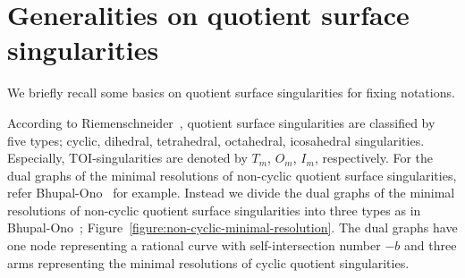 \documentclass[reqno, twoside, a4paper]{amsart}
\theoremstyle{definition}
\numberwithin{equation}{section}
\begin{document}
\section{Generalities on quotient surface singularities}
\label{section:generalities}

We briefly recall some basics on quotient surface singularities for fixing notations.

According to Riemenschneider~\cite{Riemenschneider-1981}, quotient surface singularities are classified by five types; cyclic, dihedral, tetrahedral, octahedral, icosahedral singularities. Especially, TOI-singularities are denoted by $T_{m}$, $O_{m}$, $I_{m}$, respectively. For the dual graphs of the minimal resolutions of non-cyclic quotient surface singularities, refer Bhupal-Ono~\cite{Bhupal-Ono-2012} for example. Instead we divide the dual graphs of the minimal resolutions of non-cyclic quotient surface singularities into three types as in Bhupal-Ono~\cite{Bhupal-Ono-2012}; Figure~\ref{figure:non-cyclic-minimal-resolution}. The dual graphs have one node representing a rational curve with self-intersection number $-b$ and three arms representing the minimal resolutions of cyclic quotient singularities.
\end{document}
